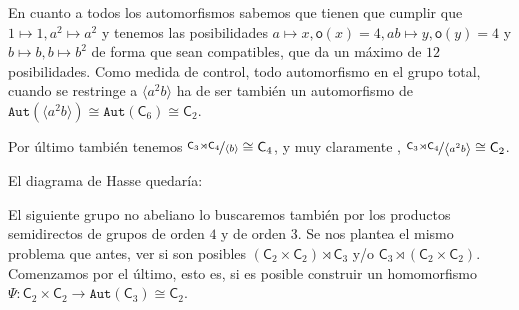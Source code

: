 \documentclass[12pt,a4paper,fleqn,spanish,final,openright]{extbook}
\theoremstyle{definition}
\theoremstyle{remark}
\begin{document}
En cuanto a todos los automorfismos sabemos que tienen que cumplir que $1    \mapsto 1 , a^2    \mapsto a^2$ y tenemos las posibilidades $a    \mapsto x , \mathsf{o}(x)=4, ab    \mapsto y, \mathsf{o}(y)=4$ y $b   \mapsto b,b   \mapsto b^2$ de forma que sean compatibles, que da un máximo de $12$ posibilidades. Como medida de control, todo automorfismo en el grupo total, cuando se restringe a $\langle a^2 b\rangle$ ha de ser también un automorfismo de $\mathtt{Aut}\left(\langle a^2 b\rangle\right)   \cong   \mathtt{Aut}\left({{\mathsf{C}}_{6}}\right)   \cong    {{\mathsf{C}}_{2}}$.

Por último también tenemos $\nicefrac{{{{\mathsf{C}}_{3}}\rtimes{{\mathsf{C}}_{4}}}}{\left\langle b \right\rangle}    \cong    {{\mathsf{C}}_{4}}$, y muy claramente , $\nicefrac{{{{\mathsf{C}}_{3}}\rtimes{{\mathsf{C}}_{4}}}}{\left\langle a^2 b \right\rangle}    \cong    {{\mathsf{C}}_{2}}$.

El diagrama de Hasse quedaría:


\begin{center}
\end{center}

El siguiente grupo no abeliano lo buscaremos también por los productos semidirectos de grupos de orden $4$ y de orden $3$. Se nos plantea el mismo problema que antes, ver si son posibles ${\left({{{\mathsf{C}}_{2}}   \times   {{\mathsf{C}}_{2}}}\right)}\rtimes{{\mathsf{C}}_{3}}$ y/o ${{\mathsf{C}}_{3}}\rtimes{\left({{{\mathsf{C}}_{2}}   \times   {{\mathsf{C}}_{2}}}\right)}$. Comenzamos por el último, esto es, si es posible construir un homomorfismo $\Psi : {{{\mathsf{C}}_{2}}   \times   {{\mathsf{C}}_{2}}}    \longrightarrow    {\mathtt{Aut}}{\left({{\mathsf{C}}_{3}}\right)}   \cong   {{\mathsf{C}}_{2}}$.
\end{document}
